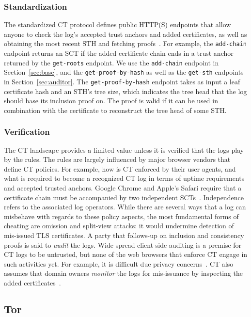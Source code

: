 \subsubsection{Standardization}
The standardized CT protocol defines public HTTP(S) endpoints that allow anyone
to check the log's accepted trust anchors and added certificates, as well as
obtaining the most recent STH and fetching proofs~\cite{ct,ct/bis}.  For
example, the \texttt{add-chain} endpoint returns an SCT if the added certificate
chain ends in a trust anchor returned by the \texttt{get-roots} endpoint.  We
use the \texttt{add-chain} endpoint in Section~\ref{sec:base}, and the
\texttt{get-proof-by-hash} as well as the \texttt{get-sth} endpoints in
Section~\ref{sec:auditor}.  The \texttt{get-proof-by-hash} endpoint takes as
input a leaf certificate hash and an STH's tree size, which indicates the tree
head that the log should base its inclusion proof on.  The proof is valid if it
can be used in combination with the certificate to reconstruct the tree head of
some STH.

\subsubsection{Verification}
The CT landscape provides a limited value unless it is verified that the logs
play by the rules.  The rules are largely influenced by major browser vendors
that define CT policies.  For example, how is CT enforced by their user agents,
and what is required to become a recognized CT log in terms of uptime
requirements and accepted trusted anchors.  Google Chrome and Apple's Safari
require that a certificate chain must be accompanied by two independent
SCTs~\cite{chrome-policy,safari-policy}.  Independence refers to the associated
log operators.  While there are several ways that
a log can misbehave with regards to these policy aspects, the most fundamental
forms of cheating are omission and split-view attacks:
	it would undermine detection of mis-issued TLS certificates.
A party that follows-up on inclusion and consistency proofs is said to
\emph{audit} the logs.  Wide-spread client-side auditing is a premise for CT
logs to be untrusted, but none of the web browsers that enforce CT engage in
such activities yet.  For example, it is difficult due privacy
concerns~\cite{ct-with-privacy}.  CT also assumes that domain owners
\emph{monitor} the logs for mis-issuance by inspecting the added
certificates~\cite{lwm,ct-monitors}.

\subsection{Tor} \label{sec:background:tor}

